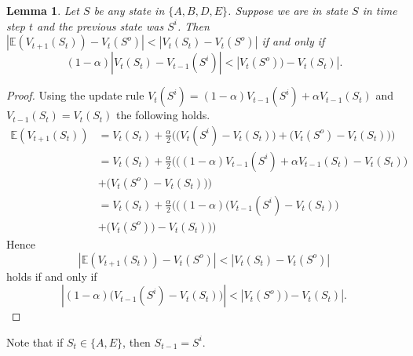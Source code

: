 \documentclass[12pt,a4paper]{article}
\newtheorem{lemma}{Lemma}
\begin{document}
\begin{enumerate}
\begin{lemma}
  Let $S$ be any state in $\{A, B, D, E\}$. Suppose we are in state $S$ in
  time step $t$ and the previous state was $S^i$. Then
  $|\mathbb{E}(V_{t + 1}(S_t)) - V_{t}(S^o)| < |V_t(S_t) - V_{t}(S^o)|$ if and only if
  \[
  (1 - \alpha) |V_t(S_t) - V_{t - 1} (S^i)| < |V_t(S^o)) - V_t(S_t)|.
  \]
\end{lemma}
\begin{proof}
  Using the update rule $ V_t(S^i) = (1 - \alpha) V_{t - 1}(S^i) + \alpha V_{t - 1}(S_t)$
  and $V_{t - 1}(S_t) = V_t(S_t)$ the following holds.
  \begin{align*}
  \mathbb{E}(V_{t + 1}(S_t))
  & = V_t(S_t) + \frac{\alpha}{2} \Big(\big(V_t(S^i) - V_t(S_t)\big) + \big(V_t(S^o) - V_t(S_t)\big)\Big)\\
  & = V_t(S_t) + \frac{\alpha}{2} \Big(\big((1 - \alpha) V_{t - 1}(S^i) +
  \alpha V_{t - 1}(S_t) - V_t(S_t)\big)\\
  & + \big(V_t(S^o) - V_t(S_t)\big)\Big)\\
  & = V_t(S_t) + \frac{\alpha}{2} \Big(((1 - \alpha) \big(V_{t - 1}(S^i) - V_t(S_t)\big)\\
  & + \big(V_t(S^o)) - V_t(S_t)\big)\Big)
  \end{align*}
  Hence
  \[|\mathbb{E}(V_{t + 1}(S_t)) - V_{t}(S^o)| < |V_t(S_t) - V_{t}(S^o)|\]
  holds if and only if
  \[|(1 - \alpha) \big(V_{t - 1}(S^i) - V_{t}(S_t)\big)| < |V_t(S^o)) - V_t(S_t)|.\]
\end{proof}

Note that if $S_t \in \{A, E\}$, then $S_{t - 1} = S^i$.


\end{enumerate}
\end{document}
